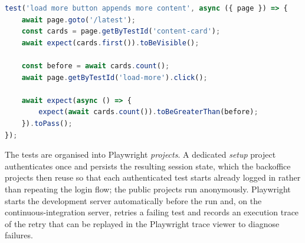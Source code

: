 \begin{lstlisting}[language=JavaScript, caption={Playwright end-to-end test: the ``load more'' control appends more content.}, label={lst:test_e2e}]
test('load more button appends more content', async ({ page }) => {
    await page.goto('/latest');
    const cards = page.getByTestId('content-card');
    await expect(cards.first()).toBeVisible();

    const before = await cards.count();
    await page.getByTestId('load-more').click();

    await expect(async () => {
        expect(await cards.count()).toBeGreaterThan(before);
    }).toPass();
});
\end{lstlisting}

The tests are organised into Playwright \emph{projects}. A dedicated \emph{setup} project
authenticates once and persists the resulting session state, which the backoffice projects
then reuse so that each authenticated test starts already logged in rather than repeating the
login flow; the public projects run anonymously. Playwright starts the development server
automatically before the run and, on the continuous-integration server, retries a failing
test and records an execution trace of the retry that can be replayed in the Playwright trace
viewer to diagnose failures.
